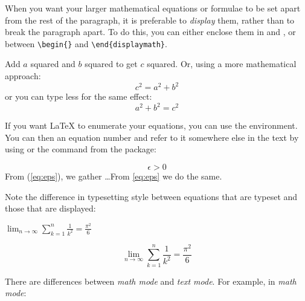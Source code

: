 When you want your larger mathematical equations or formulae to be set apart
from the rest of the paragraph, it is preferable to \emph{display} them,
rather than to break the paragraph apart.
To do this, you can either enclose them
in \ci{[} and \ci{]}, or between
\verb|\begin{|\verb|}| and
\verb|\end{displaymath}|.
\begin{example}
Add $a$ squared and $b$ squared
to get $c$ squared. Or, using
a more mathematical approach:
\begin{displaymath}
c^{2}=a^{2}+b^{2}
\end{displaymath}
or you can type less for the
same effect:
\[a^2+b^2=c^2\]
\end{example}
If you want \LaTeX{} to enumerate your equations, you can use the
 environment.
You can then  an equation number and refer to it somewhere else in the
text by using  or the   command from the  package:
\begin{example}
\begin{equation} \label{eq:eps}
\epsilon > 0
\end{equation}
From (\ref{eq:eps}), we gather 
\ldots{}From \eqref{eq:eps} we
do the same.
\end{example}

Note the difference in typesetting style between equations that are typeset and those
that are displayed:

\begin{example}
$\lim_{n \to \infty} 
\sum_{k=1}^n \frac{1}{k^2} 
= \frac{\pi^2}{6}$
\end{example}
\begin{example}
\begin{displaymath}
\lim_{n \to \infty} 
\sum_{k=1}^n \frac{1}{k^2} 
= \frac{\pi^2}{6}
\end{displaymath}
\end{example}



There are differences between \emph{math mode} and \emph{text mode}. For
example, in \emph{math mode}: 

